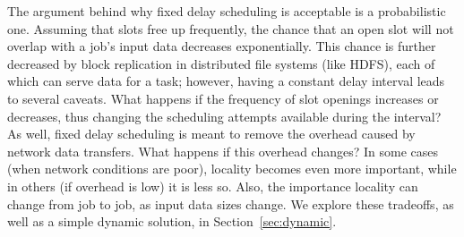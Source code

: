 The argument behind why fixed delay scheduling is acceptable is a probabilistic one. Assuming 
that slots free up frequently, the chance that an open slot will not overlap with a job's 
input data decreases exponentially. This chance is further decreased by block replication 
in distributed file systems (like HDFS), each of which can serve data for a task; however,
having a constant delay interval leads to several caveats. What happens if the frequency of
slot openings increases or decreases, thus changing the scheduling attempts available during
the interval? As well, fixed delay scheduling is meant to remove the overhead caused by 
network data transfers. What happens if this overhead changes? In some cases (when network conditions
are poor), locality becomes even more important, while in others (if overhead is low) it is less so.
Also, the importance locality can change from job to job, as input data sizes change.
We explore these tradeoffs, as well as a simple dynamic solution, in Section~\ref{sec:dynamic}.



